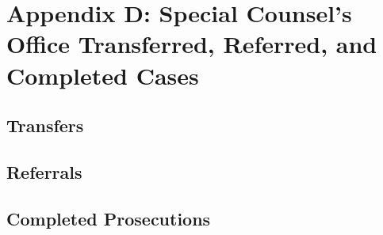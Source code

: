 \section{Appendix D: Special Counsel's Office Transferred, Referred, and Completed Cases}

\subsection{Transfers}

\subsection{Referrals}

\subsection{Completed Prosecutions}

